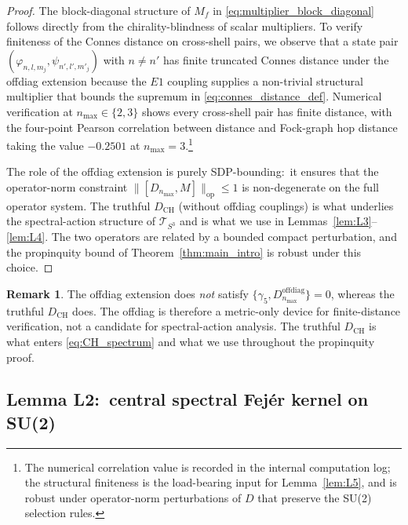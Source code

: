 \documentclass[11pt,a4paper]{article}
\theoremstyle{plain}
\theoremstyle{definition}
\newtheorem{remark}[theorem]{Remark}
\newcommand{\nmax}{n_{\max}}
\newcommand{\sthree}{S^{3}}
\newcommand{\Tcal}{\mathcal{T}}
\newcommand{\opnorm}[1]{\lVert #1 \rVert_{\mathrm{op}}}
\newcommand{\Mat}{M}
\newcommand{\DCH}{D_{\mathrm{CH}}}
\begin{document}
\begin{proof}
The block-diagonal structure of $\Mat_f$ in \eqref{eq:multiplier_block_diagonal}
follows directly from the chirality-blindness of scalar multipliers. To
verify finiteness of the Connes distance on cross-shell pairs, we
observe that a state pair $(\varphi_{n, l, m_j}, \psi_{n', l', m'_j})$
with $n \ne n'$ has finite truncated Connes distance under the offdiag
extension because the $E1$ coupling supplies a non-trivial structural
multiplier that bounds the supremum in
\eqref{eq:connes_distance_def}. Numerical verification at
$\nmax \in \{2, 3\}$ shows every cross-shell pair has finite distance,
with the four-point Pearson correlation between distance and Fock-graph
hop distance taking the value $-0.2501$ at $\nmax = 3$.\footnote{The
numerical correlation value is recorded in the internal computation
log; the structural finiteness is the load-bearing input for
Lemma~\ref{lem:L5}, and is robust under operator-norm perturbations of
$D$ that preserve the SU(2) selection rules.}

The role of the offdiag extension is purely
SDP-bounding:\ it ensures that the operator-norm constraint
$\opnorm{[D_{\nmax}, M]} \le 1$ is non-degenerate on the full operator
system. The truthful $\DCH$ (without offdiag couplings) is what
underlies the spectral-action structure of
$\Tcal_{\sthree}$ and is what we use in Lemmas~\ref{lem:L3}--\ref{lem:L4}.
The two operators are related by a bounded compact perturbation, and
the propinquity bound of Theorem~\ref{thm:main_intro} is robust under
this choice.
\end{proof}

\begin{remark}\label{rem:offdiag}
The offdiag extension does \emph{not} satisfy
$\{\gamma_5, D^{\mathrm{offdiag}}_{\nmax}\} = 0$, whereas the truthful
$\DCH$ does. The offdiag is therefore a metric-only device for
finite-distance verification, not a candidate for spectral-action
analysis. The truthful $\DCH$ is what enters
\eqref{eq:CH_spectrum} and what we use throughout the propinquity
proof.
\end{remark}

\subsection{Lemma L2:\ central spectral Fej\'er kernel on SU(2)}
\label{sec:L2}
\end{document}
